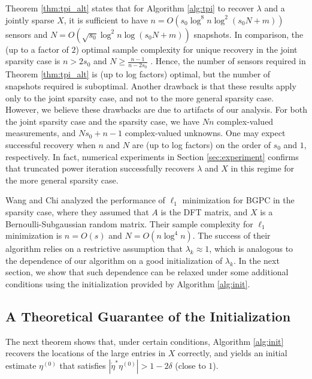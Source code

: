 \documentclass[11pt,journal]{IEEEtran}
\begin{document}
Theorem \ref{thm:tpi_alt} states that for Algorithm \ref{alg:tpi} to recover $\lambda$ and a jointly sparse $X$, it is sufficient to have $n = O(s_0\log^8n\log^2(s_0N+m))$ sensors and $N=O(\sqrt{s_0}\log^2n \log(s_0N+m))$ snapshots. In comparison, the (up to a factor of $2$) optimal sample complexity for unique recovery in the joint sparsity case is $n > 2s_0$ and $N\geq \frac{n-1}{n-2s_0}$ \cite{Li2015e}. Hence, the number of sensors required in Theorem \ref{thm:tpi_alt} is (up to log factors) optimal, but the number of snapshots required is suboptimal.
Another drawback is that these results apply only to the joint sparsity case, and not to the more general sparsity case. However, we believe these drawbacks are due to artifacts of our analysis. 
For both the joint sparsity case and the sparsity case, we have $Nn$ complex-valued measurements, and $Ns_0 + n -1$ complex-valued unknowns. One may expect successful recovery when $n$ and $N$ are (up to log factors) on the order of $s_0$ and $1$, respectively. In fact, numerical experiments in Section \ref{sec:experiment} confirms that truncated power iteration successfully recovers $\lambda$ and $X$ in this regime for the more general sparsity case. 

Wang and Chi \cite{Wang2016} analyzed the performance of $\ell_1$ minimization for BGPC in the sparsity case, where they assumed that $A$ is the DFT matrix, and $X$ is a Bernoulli-Subgaussian random matrix. Their sample complexity for $\ell_1$ minimization is $n=O(s)$ and $N = O(n\log^4 n)$. The success of their algorithm relies on a restrictive assumption that $\lambda_k\approx 1$, which is analogous to the dependence of our algorithm on a good initialization of $\lambda_k$. In the next section, we show that such dependence can be relaxed under some additional conditions using the initialization provided by Algorithm \ref{alg:init}.



\subsection{A Theoretical Guarantee of the Initialization}

The next theorem shows that, under certain conditions, Algorithm \ref{alg:init} recovers the locations of the large entries in $X$ correctly, and yields an initial estimate $\eta^{(0)}$ that satisfies $|\dot{\eta}^* \eta^{(0)}| > 1-2\delta$ (close to $1$).
\end{document}
